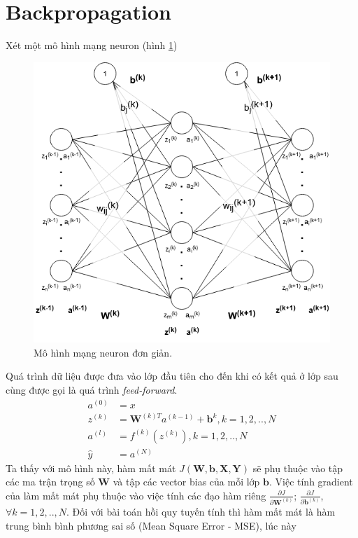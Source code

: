 \section{Backpropagation}
Xét một mô hình mạng neuron (hình \ref{fig:ann})
\begin{figure}[ht!]
	\centerline{\includegraphics[scale=0.6]{images/ann.png}}
  	\caption{Mô hình mạng neuron đơn giản.}
  	\label{fig:ann}
\end{figure}
Quá trình dữ liệu được đưa vào lớp đầu tiên cho đến khi có kết quả ở lớp sau cùng được gọi là quá trình \emph{feed-forward}.
\begin{align*}
	a^{(0)}&=x \\
	z^{(k)}&={\boldsymbol{W}^{(k)T}}{a^{(k-1)}}+{\boldsymbol{b}}^k,k=1,2,..,N \\
	a^{(l)}&=f^{(k)}\left(z^{(k)}\right),k=1,2,..,N \\
	\widehat{y}&=a^{(N)}
\end{align*}
Ta thấy với mô hình này, hàm mất mát $J\left({\boldsymbol{W}},{\boldsymbol{b}},{\boldsymbol{X}},{\boldsymbol{Y}}\right)$ sẽ phụ thuộc vào tập các ma trận trọng số $\boldsymbol{W}$ và tập các vector bias của mỗi lớp $\boldsymbol{b}$. Việc tính gradient của làm mất mát phụ thuộc vào việc tính các đạo hàm riêng ${\frac{{\partial}J}{{{\partial}\boldsymbol{W}}^{(k)}}}$; ${\frac{{\partial}J}{{\partial}\boldsymbol{b}^{(k)}}}$, ${\forall}k=1,2,..,N$. Đối với bài toán hồi quy tuyến tính thì hàm mất mát là hàm trung bình bình phương sai số (Mean Square Error - MSE), lúc này
